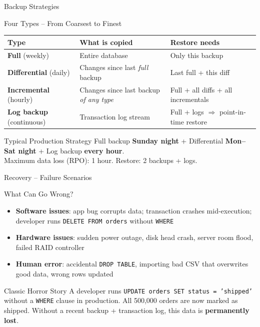 \begin{frame}{Backup Strategies}
  \begin{block}{Four Types -- From Coarsest to Finest}
    \begin{tabular}{@{}p{2.4cm}p{4.2cm}p{3.5cm}@{}}
      \toprule
      \textbf{Type} & \textbf{What is copied} & \textbf{Restore needs} \\
      \midrule
      \textbf{Full} (weekly) &
        Entire database &
        Only this backup \\[4pt]
      \textbf{Differential} (daily) &
        Changes since last \emph{full} backup &
        Last full + this diff \\[4pt]
      \textbf{Incremental} (hourly) &
        Changes since last backup \emph{of any type} &
        Full + all diffs + all incrementals \\[4pt]
      \textbf{Log backup} (continuous) &
        Transaction log stream &
        Full + logs $\Rightarrow$ point-in-time restore \\
      \bottomrule
    \end{tabular}
  \end{block}

  \begin{examples}{Typical Production Strategy}
    Full backup \textbf{Sunday night} + Differential \textbf{Mon--Sat night} +
    Log backup \textbf{every hour}.\\
    Maximum data loss (RPO): 1 hour. Restore: 2 backups + logs.
  \end{examples}
\end{frame}

\begin{frame}{Recovery -- Failure Scenarios}
  \begin{block}{What Can Go Wrong?}
    \begin{itemize}
      \item \textbf{Software issues}: app bug corrupts data; transaction crashes mid-execution;
            developer runs \texttt{DELETE FROM orders} without \texttt{WHERE}
      \item \textbf{Hardware issues}: sudden power outage, disk head crash, server room flood,
            failed RAID controller
      \item \textbf{Human error}: accidental \texttt{DROP TABLE}, importing bad CSV that
            overwrites good data, wrong rows updated
    \end{itemize}
  \end{block}

  \begin{alertblock}{Classic Horror Story}
    A developer runs \texttt{UPDATE orders SET status = 'shipped'} without a \texttt{WHERE}
    clause in production. All 500,000 orders are now marked as shipped.
    Without a recent backup + transaction log, this data is \textbf{permanently lost}.
  \end{alertblock}
\end{frame}

